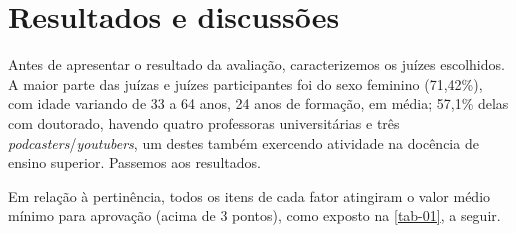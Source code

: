 \section{Resultados e discussões }\label{sec-resultados}

Antes de apresentar o resultado da avaliação, caracterizemos os juízes
escolhidos. A maior parte das juízas e juízes participantes foi do sexo
feminino (71,42\%), com idade variando de 33 a 64 anos, 24 anos de formação, em
média; 57,1\% delas com doutorado, havendo quatro professoras universitárias e
três \textit{podcasters}/\textit{youtubers}, um destes também exercendo
atividade na docência de ensino superior. Passemos aos resultados.

Em relação à pertinência, todos os itens de cada fator atingiram o valor médio
mínimo para aprovação (acima de 3 pontos), como exposto na \cref{tab-01}, a
seguir.

